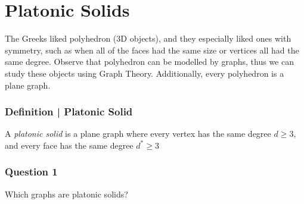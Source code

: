 \documentclass{report}
\begin{document}
\section{Platonic Solids}
The Greeks liked polyhedron (3D objects), and they especially liked ones with symmetry, such as when all of the faces had the same size or vertices all had the same degree. Observe that polyhedron can be modelled by graphs, thus we can study these objects using Graph Theory. Additionally, every polyhedron is a plane graph.
\subsubsection{Definition | Platonic Solid}
A \textit{platonic solid} is a plane graph where every vertex has the same degree $d \geq 3$, and every face has the same degree $d^* \geq 3$
\subsubsection{Question 1}
\begin{center}
Which graphs are platonic solids?
\end{center}
\end{document}

